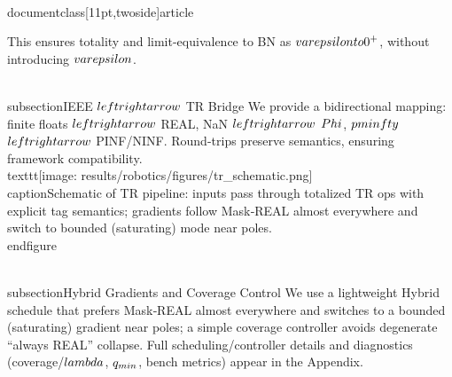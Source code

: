 \\documentclass[11pt,twoside]{article}
\begin{document}
This ensures totality and limit-equivalence to BN as $\\varepsilon \\to 0^+$, without introducing $\\varepsilon$.

\\subsection{IEEE $\\leftrightarrow$ TR Bridge}
We provide a bidirectional mapping: finite floats $\\leftrightarrow$ REAL, NaN $\\leftrightarrow$ $\\Phi$, $\\pm\\infty$ $\\leftrightarrow$ PINF/NINF. Round-trips preserve semantics, ensuring framework compatibility.
  \\texttt{[image: results/robotics/figures/tr\_schematic.png]}
  \\caption{Schematic of TR pipeline: inputs pass through totalized TR ops with explicit tag semantics; gradients follow Mask‑REAL almost everywhere and switch to bounded (saturating) mode near poles.}
\\end{figure}



\\subsection{Hybrid Gradients and Coverage Control}
We use a lightweight Hybrid schedule that prefers Mask‑REAL almost everywhere and switches to a bounded (saturating) gradient near poles; a simple coverage controller avoids degenerate “always REAL” collapse. Full scheduling/controller details and diagnostics (coverage/$\\lambda$, $q_{\\min}$, bench metrics) appear in the Appendix.
\end{document}
